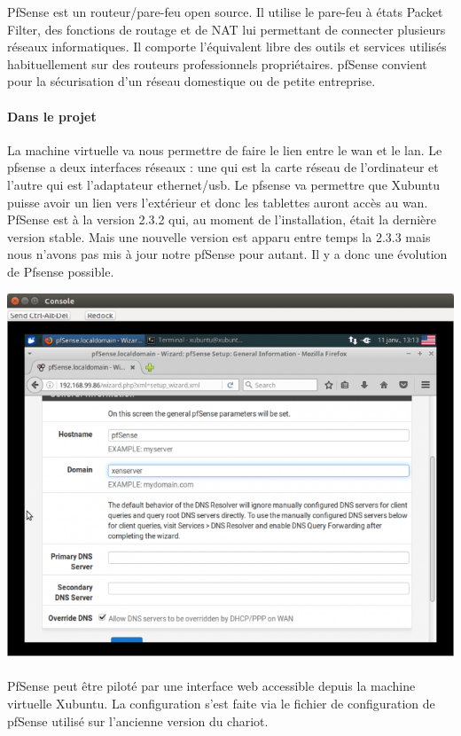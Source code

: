\documentclass[a4paper,12pt]{extarticle}
\begin{document}
PfSense est un routeur/pare-feu open source. Il utilise le pare-feu à états Packet Filter, des fonctions de routage et de NAT lui permettant de connecter plusieurs réseaux informatiques. Il comporte l'équivalent libre des outils et services utilisés habituellement sur des routeurs professionnels propriétaires. pfSense convient pour la sécurisation d'un réseau domestique ou de petite entreprise.


\paragraph{Dans le projet\\}

La machine virtuelle va nous permettre de faire le lien entre le wan et le lan. Le pfsense a deux interfaces réseaux : une qui est la carte réseau de l’ordinateur et l’autre qui est l’adaptateur ethernet/usb. Le pfsense va permettre que Xubuntu puisse avoir un lien vers l’extérieur et donc les tablettes auront accès au wan. \newline
PfSense est à la version 2.3.2 qui, au moment de l’installation, était la dernière version stable. Mais une nouvelle version est apparu entre temps la 2.3.3 mais nous n’avons pas mis à jour notre pfSense pour autant. Il y a donc une évolution de Pfsense possible. 

\begin{center}
\includegraphics[scale=0.65]{pfsense}\\
\end{center}
\paragraph{}
PfSense peut être piloté par une interface web accessible depuis la machine virtuelle Xubuntu. La configuration s’est faite via le fichier de configuration de pfSense utilisé sur l’ancienne version du chariot.\\
\end{document}

